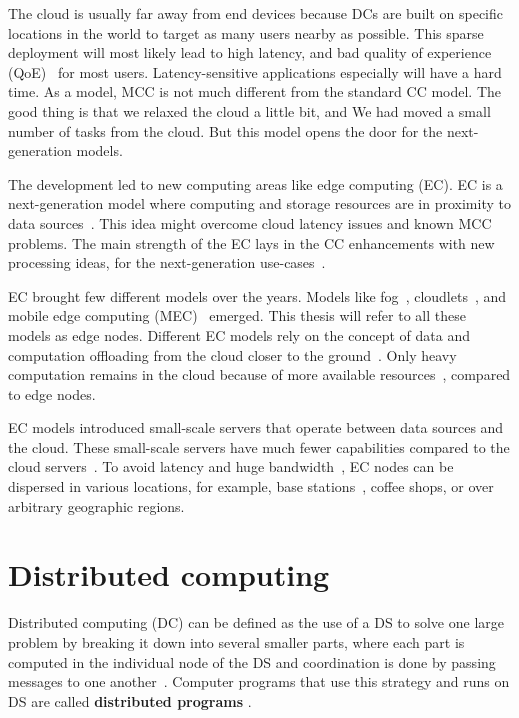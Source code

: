 The cloud is usually far away from end devices because DCs are built on specific locations in the world to target as many users nearby as possible. This sparse deployment will most likely lead to high latency, and bad quality of experience (QoE)~\cite{LinLJL19} for most users. Latency-sensitive applications especially will have a hard time. As a model, MCC is not much different from the standard CC model. The good thing is that we relaxed the cloud a little bit, and We had moved a small number of tasks from the cloud. But this model opens the door for the next-generation models.

The development led to new computing areas like edge computing (EC). EC is a next-generation model where computing and storage resources are in proximity to data sources~\cite{Satyanarayanan17}. This idea might overcome cloud latency issues and known MCC problems. The main strength of the EC lays in the CC enhancements with new processing ideas, for the next-generation use-cases~\cite{NingLSY20}. 

EC brought few different models over the years. Models like fog~\cite{BonomiMNZ14}, cloudlets~\cite{MonsalveCC18}, and mobile edge computing (MEC)~\cite{WangZZWYW17} emerged. This thesis will refer to all these models as edge nodes. Different EC models rely on the concept of data and computation offloading from the cloud closer to the ground~\cite{KhuneP19}. Only heavy computation remains in the cloud because of more available resources~\cite{NingLSY20}, compared to edge nodes. 

EC models introduced small-scale servers that operate between data sources and the cloud. These small-scale servers have much fewer capabilities compared to the cloud servers~\cite{ChenHLLW15}. To avoid latency and huge bandwidth~\cite{MonsalveCC18}, EC nodes can be dispersed in various locations, for example, base stations~\cite{WangZZWYW17}, coffee shops, or over arbitrary geographic regions.
%
%
\section{Distributed computing}\label{sec:distributed_computing}
%
Distributed computing (DC) can be defined as the use of a DS to solve one large problem by breaking it down into several smaller parts, where each part is computed in the individual node of the DS and coordination is done by passing messages to one another~\cite{0019513}. Computer programs that use this strategy and runs on DS are called \textbf{distributed programs} \cite{Vera16, andrews2000foundations}. 

